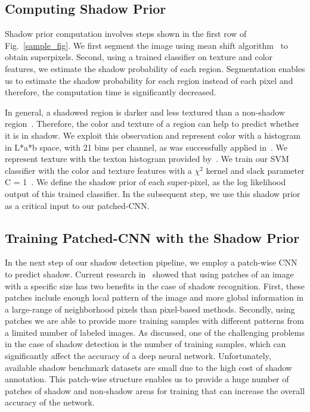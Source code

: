 \documentclass[letterpaper, 10 pt, conference]{ieeeconf}
\begin{document}
\subsection{Computing Shadow Prior}
\label{sh_prior}
Shadow prior computation involves steps shown in the first row of Fig.~\ref{sample_fig}. We first segment the image using mean shift algorithm~\cite{mean_shift} to obtain superpixels. Second, using a trained classifier on texture and color features, we estimate the shadow probability of each region. Segmentation enables us to estimate the shadow probability for each region instead of each pixel and therefore, the computation time is significantly decreased.

In general, a shadowed region is darker and less textured than a non-shadow region~\cite{Zhu}. Therefore, the color and texture of a region can help to predict whether it is in shadow. We exploit this observation and represent color with a histogram in L*a*b space, with 21 bins per channel, as was successfully applied in~\cite{Gue}. We represent texture with the texton histogram provided by~\cite{Martin}. We train our SVM classifier with the color and texture features with a $\chi^2$ kernel and slack parameter C = 1~\cite{libsvm}. We define the shadow prior of each super-pixel, as the log likelihood output of this trained classifier. In the subsequent step, we use this shadow prior as a critical input to our patched-CNN. 

\subsection{Training Patched-CNN with the Shadow Prior}
\label{patched_cnn}
In the next step of our shadow detection pipeline, we employ a patch-wise CNN to predict shadow. Current research in~\cite{Vicente2} showed that using patches of an image with a specific size has two benefits in the case of shadow recognition. First, these patches include enough local pattern of the image and more global information in a large-range of neighborhood pixels than pixel-based methods. Secondly, using patches we are able to provide more training samples with different patterns from a limited number of labeled images. As discussed, one of the challenging problems in the case of shadow detection is the number of training samples, which can significantly affect the accuracy of a deep neural network. Unfortunately, available shadow benchmark datasets are small due to the high cost of shadow annotation. This patch-wise structure enables us to provide a huge number of patches of shadow and non-shadow areas for training that can increase the overall accuracy of the network.
\end{document}
